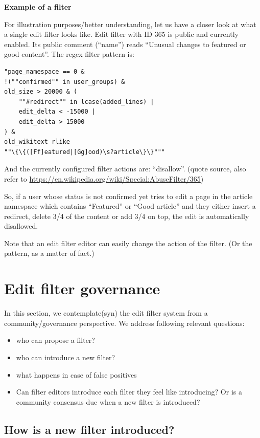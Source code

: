 \documentclass{sigchi}
\begin{document}
\textbf{Example of a filter}

For illustration purposes/better understanding, let us have a closer look at what a single edit filter looks like.
Edit filter with ID 365 is public and currently enabled.
Its public comment (``name'') reads ``Unusual changes to featured or good content''.
The regex filter pattern is:
\begin{verbatim}
"page_namespace == 0 &
!(""confirmed"" in user_groups) &
old_size > 20000 & (
    ""#redirect"" in lcase(added_lines) |
    edit_delta < -15000 |
    edit_delta > 15000
) &
old_wikitext rlike
""\{\{([Ff]eatured|[Gg]ood)\s?article\}\}"""
\end{verbatim}
And the currently configured filter actions are: ``disallow''.
(quote source, also refer to \url{https://en.wikipedia.org/wiki/Special:AbuseFilter/365})

So, if a user whose status is not confirmed yet tries to edit a page in the article namespace which contains ``Featured'' or ``Good article'' and they either insert a redirect, delete 3/4 of the content or add 3/4 on top, the edit is automatically disallowed.

Note that an edit filter editor can easily change the action of the filter. (Or the pattern, as a matter of fact.)


\section{Edit filter governance}

In this section, we contemplate(syn) the edit filter system from a community/governance perspective.
We address following relevant questions:

\begin{itemize}
    \item who can propose a filter?
    \item who can introduce a new filter?
    \item what happens in case of false positives
    \item Can filter editors introduce each filter they feel like introducing? Or is a community consensus due when a new filter is introduced?
\end{itemize}

\subsection{How is a new filter introduced?}
\end{document}
